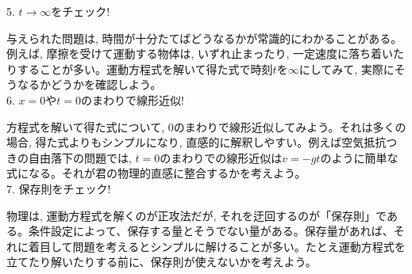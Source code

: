 5. $t\rightarrow\infty$をチェック!

与えられた問題は, 時間が十分たてばどうなるかが常識的にわかることがある。例えば, 摩擦を受けて運動する物体は, いずれ止まったり, 一定速度に落ち着いたりすることが多い。運動方程式を解いて得た式で時刻$t$を$\infty$にしてみて, 実際にそうなるかどうかを確認しよう。\\

6. $x=0$や$t=0$のまわりで線形近似!

方程式を解いて得た式について, 0のまわりで線形近似してみよう。それは多くの場合, 得た式よりもシンプルになり, 直感的に解釈しやすい。例えば空気抵抗つきの自由落下の問題では, $t=0$のまわりでの線形近似は$v=-gt$のように簡単な式になる。それが君の物理的直感に整合するかを考えよう。\\

7. 保存則をチェック!

物理は, 運動方程式を解くのが正攻法だが, それを迂回するのが「保存則」である。条件設定によって、保存する量とそうでない量がある。保存量があれば、それに着目して問題を考えるとシンプルに解けることが多い。たとえ運動方程式を立てたり解いたりする前に、保存則が使えないかを考えよう。\\


